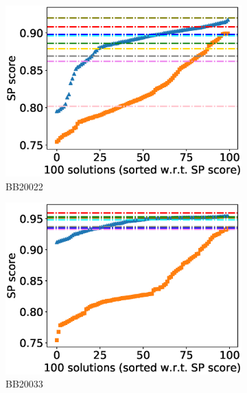 \begin{figure}[!htbp]
\begin{adjustwidth}{-1cm}{-1cm}
\begin{subfigure}{0.22\textwidth}
			\includegraphics[width=\columnwidth]{Figure/summary/precomputedInit/Balibase/BB20022_pairs_density_single_run_2}
			\caption{BB20022}
		\end{subfigure}
		\begin{subfigure}{0.22\textwidth}
			\includegraphics[width=\columnwidth]{Figure/summary/precomputedInit/Balibase/BB20033_pairs_density_single_run_2}
			\caption{BB20033}
		\end{subfigure}
		\begin{subfigure}{0.22\textwidth}

\end{subfigure}
\end{adjustwidth}
\end{figure}
